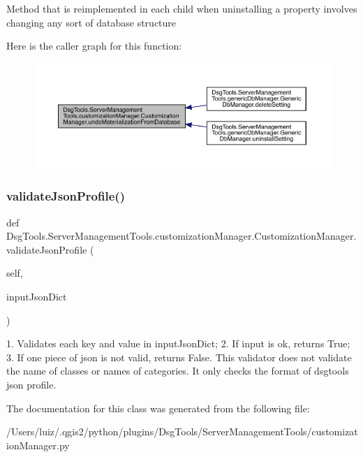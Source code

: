 \begin{DoxyVerb}Method that is reimplemented in each child when uninstalling a property involves changing any sort of database structure
\end{DoxyVerb}
 Here is the caller graph for this function\+:
\nopagebreak
\begin{figure}[H]
\begin{center}
\leavevmode
\includegraphics[width=350pt]{class_dsg_tools_1_1_server_management_tools_1_1customization_manager_1_1_customization_manager_a108ee02a6c33d1fd38f72eb3c9a4780f_icgraph}
\end{center}
\end{figure}
\mbox{\label{class_dsg_tools_1_1_server_management_tools_1_1customization_manager_1_1_customization_manager_ac70eb9c7eb2d708ed0cdbd17c83f4b6d}} 
\subsubsection{\texorpdfstring{validate\+Json\+Profile()}{validateJsonProfile()}}
{\footnotesize\ttfamily def Dsg\+Tools.\+Server\+Management\+Tools.\+customization\+Manager.\+Customization\+Manager.\+validate\+Json\+Profile (\begin{DoxyParamCaption}\item[{}]{self,  }\item[{}]{input\+Json\+Dict }\end{DoxyParamCaption})}

\begin{DoxyVerb}1. Validates each key and value in inputJsonDict;
2. If input is ok, returns True;
3. If one piece of json is not valid, returns False.
This validator does not validate the name of classes or names of categories. It only checks the format of dsgtools json profile.
\end{DoxyVerb}
 

The documentation for this class was generated from the following file\+:\begin{DoxyCompactItemize}
\item 
/\+Users/luiz/.\+qgis2/python/plugins/\+Dsg\+Tools/\+Server\+Management\+Tools/customization\+Manager.\+py\end{DoxyCompactItemize}
